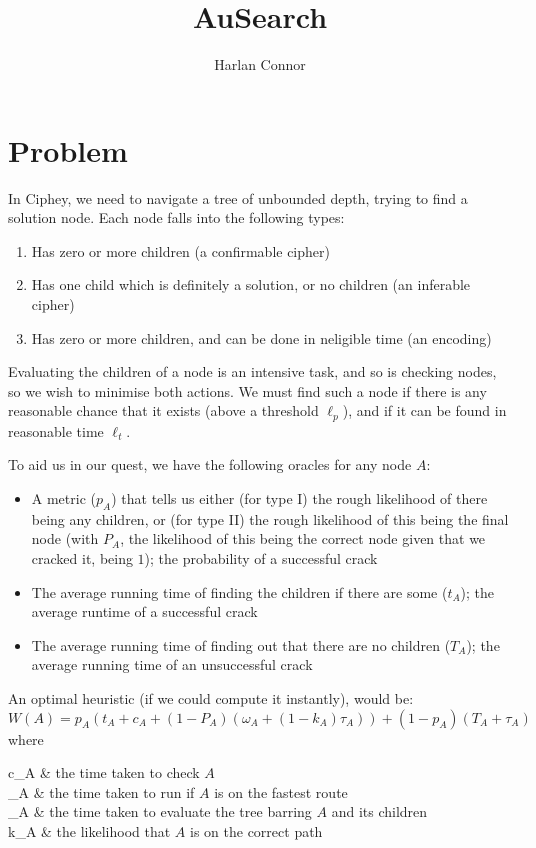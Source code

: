 \documentclass{article}
\title{AuSearch}
\author{Harlan Connor}
\makeatletter
\newenvironment{conditions*}
  {\par\vspace{\abovedisplayskip}\noindent
   \tabularx{\columnwidth}{>{$}l<{$} @{${}={}$} >{\raggedright\arraybackslash}X}}
  {\endtabularx\par\vspace{\belowdisplayskip}}
\theoremstyle{definition}
\makeatother
\begin{document}
\maketitle
\pagebreak

\section{Problem}
In Ciphey, we need to navigate a tree of unbounded depth, trying to find a 
solution node. Each node falls into the following types:
\begin{enumerate}[label=\Roman*]
\item Has zero or more children (a confirmable cipher)
\item Has one child which is definitely a solution, or no children (an inferable cipher)
\item  Has zero or more children, and can be done in neligible time (an encoding)
\end{enumerate}

Evaluating the children of a node is an intensive task, and so is checking nodes,
so we wish to minimise both actions. We must find such a node if there is any 
reasonable chance that it exists (above a threshold $\ell_p$), and if it can be 
found in reasonable time $\ell_t$.

To aid us in our quest, we have the following oracles for any node $A$:
\begin{itemize}
\item A metric ($p_A$) that tells us either (for type I) the rough likelihood of there being any children, or (for type II) the rough likelihood of this being the final node (with $P_A$, the likelihood of this being the correct node given that we cracked it, being $1$); 
      the probability of a successful crack
\item The average running time of finding the children if there are some ($t_A$);
      the average runtime of a successful crack
\item The average running time of finding out that there are no children ($T_A$);
      the average running time of an unsuccessful crack
\end{itemize}

An optimal heuristic (if we could compute it instantly), would be:
\[
	W(A) = p_A (t_A + c_A + (1-P_A) (\omega_A + (1-k_A) \tau_A)) + (1 - p_A) (T_A + \tau_A)
\]
where
\begin{conditions*}
	c_A & the time taken to check $A$ \\
	\omega_A & the time taken to run if $A$ is on the fastest route \\
	\tau_A & the time taken to evaluate the tree barring $A$ and its children \\
	k_A & the likelihood that $A$ is on the correct path \\
\end{conditions*}
\end{document}
